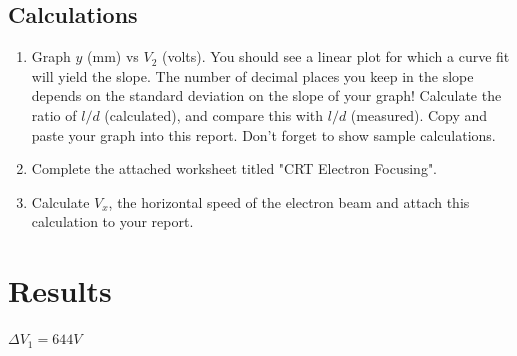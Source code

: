 \documentclass[twocolumn,english]{IEEEtran}
\theoremstyle{plain}
\theoremstyle{plain}
\begin{document}
\subsection{Calculations}
  \begin{enumerate}
  \item
    Graph $y$ (mm) vs $V_2$ (volts).
    You should see a linear plot for which a curve fit will yield the slope.
    The number of decimal places you keep in the slope depends on the standard deviation on the slope of your graph!
    Calculate the ratio of $l/d$ (calculated), and compare this with $l/d$ (measured).
    Copy and paste your graph into this report. Don't forget to show sample calculations.\vspace{2pt}

  \item
    Complete the attached worksheet titled "CRT Electron Focusing".\vspace{2pt}

  \item
    Calculate $V_x$, the horizontal speed of the electron beam and attach this calculation to your report.\vspace{2pt}
  \end{enumerate}


\section{Results}
  \centerline{\underline{$ \Delta V_1 = 644 V$}}
\end{document}
